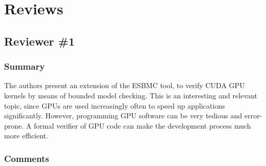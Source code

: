 \documentclass[12pt]{article}
\begin{document}
\setcounter{secnumdepth}{0}

\section{Reviews}

\subsection{Reviewer \#1}

\subsubsection{Summary}

The authors present an extension of the ESBMC tool, to verify CUDA GPU kernels by means of bounded model checking. This is an interesting and relevant topic, since GPUs are used increasingly often to speed up applications significantly. However, programming GPU software can be very tedious and error-prone. A formal verifier of GPU code can make the development process much more efficient.

\subsubsection{Comments}
\end{document}
